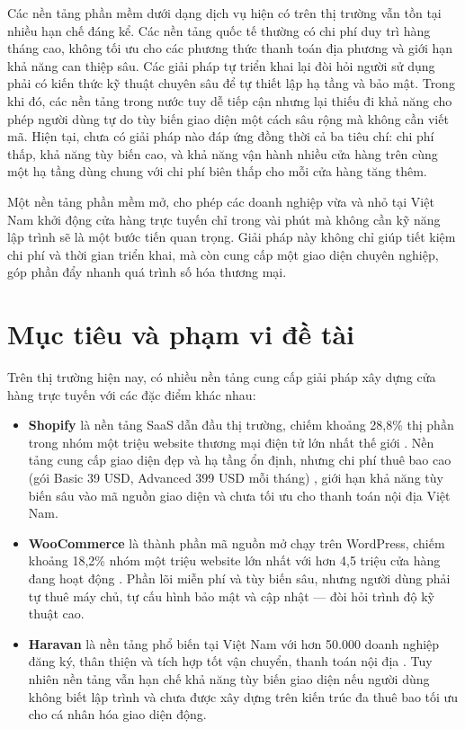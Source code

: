 \documentclass[../main.tex]{subfiles}
\begin{document}
Các nền tảng phần mềm dưới dạng dịch vụ hiện có trên thị trường vẫn tồn tại nhiều hạn chế đáng kể. Các nền tảng quốc tế thường có chi phí duy trì hàng tháng cao, không tối ưu cho các phương thức thanh toán địa phương và giới hạn khả năng can thiệp sâu. Các giải pháp tự triển khai lại đòi hỏi người sử dụng phải có kiến thức kỹ thuật chuyên sâu để tự thiết lập hạ tầng và bảo mật. Trong khi đó, các nền tảng trong nước tuy dễ tiếp cận nhưng lại thiếu đi khả năng cho phép người dùng tự do tùy biến giao diện một cách sâu rộng mà không cần viết mã. Hiện tại, chưa có giải pháp nào đáp ứng đồng thời cả ba tiêu chí: chi phí thấp, khả năng tùy biến cao, và khả năng vận hành nhiều cửa hàng trên cùng một hạ tầng dùng chung với chi phí biên thấp cho mỗi cửa hàng tăng thêm.

Một nền tảng phần mềm mở, cho phép các doanh nghiệp vừa và nhỏ tại Việt Nam khởi động cửa hàng trực tuyến chỉ trong vài phút mà không cần kỹ năng lập trình sẽ là một bước tiến quan trọng. Giải pháp này không chỉ giúp tiết kiệm chi phí và thời gian triển khai, mà còn cung cấp một giao diện chuyên nghiệp, góp phần đẩy nhanh quá trình số hóa thương mại.

\section{Mục tiêu và phạm vi đề tài}
\label{section:1.2}

Trên thị trường hiện nay, có nhiều nền tảng cung cấp giải pháp xây dựng cửa hàng trực tuyến với các đặc điểm khác nhau:

\begin{itemize}
    \item \textbf{Shopify} là nền tảng SaaS dẫn đầu thị trường, chiếm khoảng 28,8\% thị phần trong nhóm một triệu website thương mại điện tử lớn nhất thế giới \cite{builtwith2026, redstag_shopify2026}. Nền tảng cung cấp giao diện đẹp và hạ tầng ổn định, nhưng chi phí thuê bao cao (gói Basic 39 USD, Advanced 399 USD mỗi tháng) \cite{shopify_docs, shero_pricing2026}, giới hạn khả năng tùy biến sâu vào mã nguồn giao diện và chưa tối ưu cho thanh toán nội địa Việt Nam.
    \item \textbf{WooCommerce} là thành phần mã nguồn mở chạy trên WordPress, chiếm khoảng 18,2\% nhóm một triệu website lớn nhất với hơn 4,5 triệu cửa hàng đang hoạt động \cite{mobiloud2026, storeleads_woo2025}. Phần lõi miễn phí và tùy biến sâu, nhưng người dùng phải tự thuê máy chủ, tự cấu hình bảo mật và cập nhật --- đòi hỏi trình độ kỹ thuật cao.
    \item \textbf{Haravan} là nền tảng phổ biến tại Việt Nam với hơn 50.000 doanh nghiệp đăng ký, thân thiện và tích hợp tốt vận chuyển, thanh toán nội địa \cite{haravan_platform, haravan_pricing2026}. Tuy nhiên nền tảng vẫn hạn chế khả năng tùy biến giao diện nếu người dùng không biết lập trình và chưa được xây dựng trên kiến trúc đa thuê bao tối ưu cho cá nhân hóa giao diện động.
\end{itemize}
\end{document}
